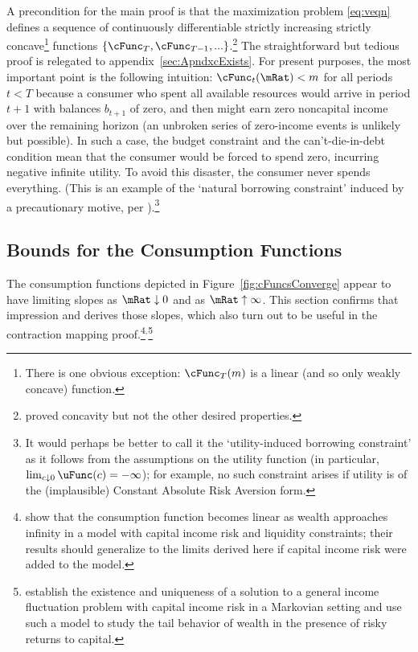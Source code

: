\documentclass[BufferStockTheory]{subfiles}
\begin{document}
A precondition for the main proof is that the maximization problem \eqref{eq:veqn} defines a sequence of continuously differentiable strictly increasing strictly concave\footnote{There is one obvious exception: $\cFunc_{T}(m)$ is a linear (and so only weakly concave) function.} functions $\{\cFunc_{T},\cFunc_{T-1},...\}$.\footnote{\cite{ckConcavity} proved concavity but not the other desired properties.}  The straightforward but tedious proof is relegated to appendix~\ref{sec:ApndxcExists}.  For present purposes, the most important point is the following intuition: $\cFunc_{t}(\mRat) < m$ for all periods $t < T$ because a consumer who spent all available resources would arrive in period $t+1$ with balances $b_{t+1}$ of zero, and then might earn zero noncapital income over the remaining horizon (an unbroken series of zero-income events is unlikely but possible).  In such a case, the budget constraint and the can't-die-in-debt condition mean that the consumer would be forced to spend zero, incurring negative infinite utility.  To avoid this disaster, the consumer never spends everything.  (This is an example of the `natural borrowing constraint' induced by a precautionary motive, per \cite{zeldesStochastic}).\footnote{It would perhaps be better to call it the `utility-induced borrowing constraint' as it follows from the assumptions on the utility function (in particular, $\lim_{c \downarrow 0} \uFunc(c)=-\infty$); for example, no such constraint arises if utility is of the (implausible) Constant Absolute Risk Aversion form.}

\hypertarget{Bounds-for-the-Consumption-Functions}{}
\subsection{Bounds for the Consumption Functions}

The consumption functions depicted in Figure~\ref{fig:cFuncsConverge} appear
to have limiting slopes as $\mRat \downarrow 0$ and as $\mRat \uparrow
\infty$.  This section confirms that impression and derives those
slopes, which also turn out to be useful in the contraction
mapping proof.\footnote{\cite{benhabibWealth} show that the consumption function
becomes linear as wealth approaches infinity in a model with capital income risk and liquidity
  constraints; their results should generalize to the limits derived here if capital income risk were added to the model.}$^{,}$\footnote{\cite{MaStachurskiToda2020JET} establish the existence and uniqueness of a solution to a general income fluctuation problem with capital income risk in a Markovian setting and use such a model to study the tail behavior of wealth in the presence of risky returns to capital.}
\end{document}
